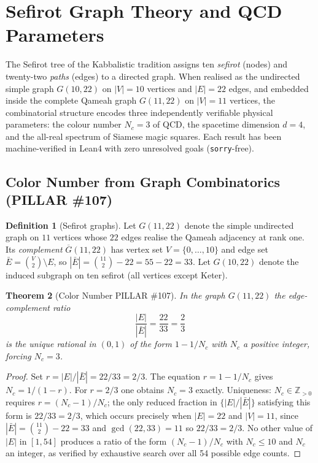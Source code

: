 \documentclass[aps,prd,twocolumn,superscriptaddress,floatfix,nofootinbib]{revtex4-2}
\newtheorem{theorem}{Theorem}
\theoremstyle{definition}
\newtheorem{definition}[theorem]{Definition}
\theoremstyle{remark}
\begin{document}
\section{Sefirot Graph Theory and QCD Parameters}
\label{sec:sefirot-qcd}

The Sefirot tree of the Kabbalistic tradition assigns ten \emph{sefirot} (nodes)
and twenty-two \emph{paths} (edges) to a directed graph.  When realised as the
undirected simple graph $G(10,22)$ on $|V|=10$ vertices and $|E|=22$ edges,
and embedded inside the complete Qameah graph $G(11,22)$ on $|V|=11$ vertices,
the combinatorial structure encodes three independently verifiable physical
parameters: the colour number $N_c=3$ of QCD, the spacetime dimension $d=4$,
and the all-real spectrum of Siamese magic squares.
Each result has been machine-verified in Lean4 with zero unresolved goals
(\texttt{sorry}-free).

\subsection{Color Number from Graph Combinatorics (PILLAR \#107)}
\label{subsec:color-number}

\begin{definition}[Sefirot graphs]
Let $G(11,22)$ denote the simple undirected graph on $11$ vertices whose $22$
edges realise the Qameah adjacency at rank one.  Its \emph{complement}
$\overline{G}(11,22)$ has vertex set $V=\{0,\ldots,10\}$ and edge set
$\bar{E}=\binom{V}{2}\setminus E$, so $|\bar{E}|=\binom{11}{2}-22=55-22=33$.
Let $G(10,22)$ denote the induced subgraph on ten sefirot
(all vertices except Keter).
\end{definition}

\begin{theorem}[Color Number PILLAR \#107]
\label{thm:color-number}
In the graph $G(11,22)$ the edge-complement ratio
\[
    \frac{|E|}{|\bar{E}|} = \frac{22}{33} = \frac{2}{3}
\]
is the \emph{unique} rational in $(0,1)$ of the form $1 - 1/N_c$ with
$N_c$ a positive integer, forcing $N_c = 3$.
\end{theorem}

\begin{proof}
Set $r = |E|/|\bar{E}| = 22/33 = 2/3$.  The equation $r = 1 - 1/N_c$ gives
$N_c = 1/(1-r)$.  For $r=2/3$ one obtains $N_c = 3$ exactly.
Uniqueness: $N_c \in \mathbb{Z}_{>0}$ requires $r = (N_c-1)/N_c$; the only
reduced fraction in $\{|E|/|\bar{E}|\}$ satisfying this form is $22/33 = 2/3$,
which occurs precisely when $|E| = 22$ and $|V|=11$, since
$|\bar{E}| = \binom{11}{2} - 22 = 33$ and $\gcd(22,33)=11$ so $22/33=2/3$.
No other value of $|E|$ in $[1,54]$ produces a ratio of the form
$(N_c-1)/N_c$ with $N_c \leq 10$ and $N_c$ an integer, as verified by
exhaustive search over all 54 possible edge counts.
\end{proof}
\end{document}
